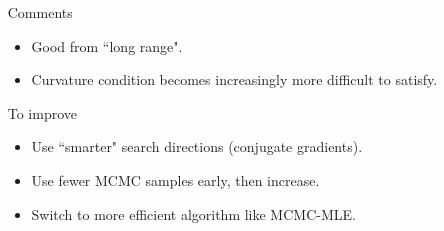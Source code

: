 \documentclass[ 10pt]{beamer}
\begin{document}
{\begin{columns}[]
\begin{column}[T]{0.55\textwidth}
{\begin{table}
\begin{center}
\begin{tabular}{rrrrrrr}
   \hline
\end{tabular}
\end{center}
\end{table}
}
\end{column}
\begin{column}[T]{0.5\textwidth}
\pause
\pause
{\small
Comments
\begin{itemize}
\item Good from ``long range".
\item Curvature condition becomes increasingly more difficult to satisfy.
\end{itemize}
\vspace{2mm}
\pause

To improve
\begin{itemize}
\item Use ``smarter" search directions (conjugate gradients).
\item Use fewer MCMC samples early, then increase.
\item Switch to more efficient algorithm like MCMC-MLE.  
\end{itemize}
}

\end{column}
\end{columns}
}





\end{document}

